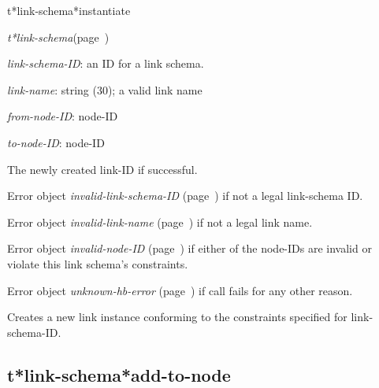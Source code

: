 \begin{description}
\item [Name:]  t*link-schema*instantiate

\item [Class:] {\sl t*link-schema}\hfill(page~\pageref{t*link-schema})

\item [Parameters:]
\item {\sl link-schema-ID}:  an ID for a link schema.

\item {\sl link-name}:  string (30); a valid link name

\item {\sl from-node-ID}:  node-ID

\item {\sl to-node-ID}:  node-ID



\item [Return-value:]
The newly created link-ID if successful.

Error object {\sl invalid-link-schema-ID} (page~\pageref{invalid-link-schema-ID}) if not
a legal link-schema ID.

Error object {\sl invalid-link-name} (page~\pageref{invalid-link-name}) if not a 
legal link name.

Error object {\sl invalid-node-ID} (page~\pageref{invalid-node-ID}) if either of 
the node-IDs are invalid or violate this link schema's
constraints. 

Error object {\sl unknown-hb-error} (page~\pageref{unknown-hb-error}) if call fails for
any other reason.

\item [Description:]

Creates a new link instance conforming to the constraints
specified for link-schema-ID. 

\item [Public:]



\end{description}
\horizontalline

\subsection{t*link-schema*add-to-node}
\label{t*link-schema*add-to-node}

